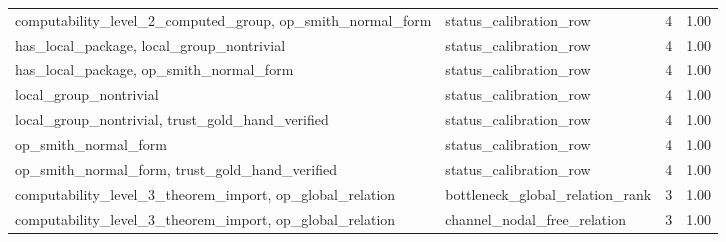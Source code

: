 \begin{table}[h]
\begin{tabular}{|p{}|p{}|p{}|p{}|}
computability\_\allowbreak{}level\_\allowbreak{}2\_\allowbreak{}computed\_\allowbreak{}group, op\_\allowbreak{}smith\_\allowbreak{}normal\_\allowbreak{}form & status\_\allowbreak{}calibration\_\allowbreak{}row & 4 & 1.00 \\
has\_\allowbreak{}local\_\allowbreak{}package, local\_\allowbreak{}group\_\allowbreak{}nontrivial & status\_\allowbreak{}calibration\_\allowbreak{}row & 4 & 1.00 \\
has\_\allowbreak{}local\_\allowbreak{}package, op\_\allowbreak{}smith\_\allowbreak{}normal\_\allowbreak{}form & status\_\allowbreak{}calibration\_\allowbreak{}row & 4 & 1.00 \\
local\_\allowbreak{}group\_\allowbreak{}nontrivial & status\_\allowbreak{}calibration\_\allowbreak{}row & 4 & 1.00 \\
local\_\allowbreak{}group\_\allowbreak{}nontrivial, trust\_\allowbreak{}gold\_\allowbreak{}hand\_\allowbreak{}verified & status\_\allowbreak{}calibration\_\allowbreak{}row & 4 & 1.00 \\
op\_\allowbreak{}smith\_\allowbreak{}normal\_\allowbreak{}form & status\_\allowbreak{}calibration\_\allowbreak{}row & 4 & 1.00 \\
op\_\allowbreak{}smith\_\allowbreak{}normal\_\allowbreak{}form, trust\_\allowbreak{}gold\_\allowbreak{}hand\_\allowbreak{}verified & status\_\allowbreak{}calibration\_\allowbreak{}row & 4 & 1.00 \\
computability\_\allowbreak{}level\_\allowbreak{}3\_\allowbreak{}theorem\_\allowbreak{}import, op\_\allowbreak{}global\_\allowbreak{}relation & bottleneck\_\allowbreak{}global\_\allowbreak{}relation\_\allowbreak{}rank & 3 & 1.00 \\
computability\_\allowbreak{}level\_\allowbreak{}3\_\allowbreak{}theorem\_\allowbreak{}import, op\_\allowbreak{}global\_\allowbreak{}relation & channel\_\allowbreak{}nodal\_\allowbreak{}free\_\allowbreak{}relation & 3 & 1.00 \\
\hline
\end{tabular}
\end{table}

